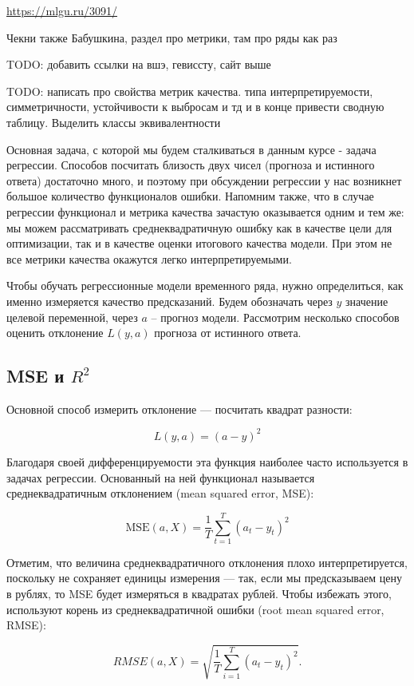 \url{https://mlgu.ru/3091/}

Чекни также Бабушкина, раздел про метрики, там про ряды как раз

TODO: добавить ссылки на вшэ, гевиссту, сайт выше

TODO: написать про свойства метрик качества. типа интерпретируемости,
симметричности, устойчивости к выбросам и тд и в конце привести
сводную таблицу. Выделить классы эквивалентности

Основная задача, с которой мы будем сталкиваться в данным курсе -
задача регрессии. Способов посчитать близость двух чисел
(прогноза и истинного ответа) достаточно много, и поэтому при
обсуждении регрессии у нас возникнет большое количество функционалов ошибки.
Напомним также, что в случае регрессии функционал и метрика качества
зачастую оказывается одним и тем же: мы можем рассматривать
среднеквадратичную ошибку как в качестве цели для оптимизации, так
и в качестве оценки итогового качества модели. При этом не все
метрики качества окажутся легко интерпретируемыми.

Чтобы обучать регрессионные модели временного ряда, нужно
определиться, как именно измеряется качество предсказаний. Будем
обозначать через \( y \) значение целевой переменной, через \( a \) --
прогноз модели.
Рассмотрим несколько способов оценить отклонение \( L(y, a) \)
прогноза от истинного ответа.

\subsection*{MSE и \( R^2 \)}
Основной способ измерить отклонение — посчитать квадрат разности:

\[ L(y, a) = (a - y)^2 \]

Благодаря своей дифференцируемости эта функция наиболее часто
используется в задачах регрессии. Основанный на ней функционал
называется среднеквадратичным отклонением (mean squared error, MSE):

\[ \text{MSE}(a, X) = \frac{1}{T} \sum_{t=1}^{T} (a_t - y_t)^2 \]

Отметим, что величина среднеквадратичного отклонения плохо
интерпретируется, поскольку не сохраняет единицы измерения — так,
если мы предсказываем цену в рублях, то MSE будет измеряться в
квадратах рублей. Чтобы избежать этого, используют корень из
среднеквадратичной ошибки (root mean squared error, RMSE):

\[
  RMSE(a, X) = \sqrt{\frac{1}{T} \sum_{i=1}^{T} (a_t - y_t)^2}.
\]


